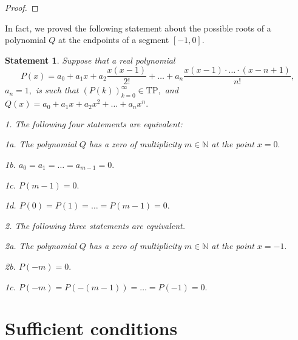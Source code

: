 \documentclass[12pt]{amsart}
\newcounter{count}
\numberwithin{count}{section}
\newtheorem{Statement}[count]{Statement}
\begin{document}
\begin{proof}


\end{proof}

In fact, we proved the following statement  about the possible 
roots of a polynomial $Q$ at the endpoints of a segment $[-1, 0].$

\begin{Statement}
\label{st2}
Suppose that a real polynomial 
$$P(x)= a_0 + a_1 x +a_2 \frac{x(x-1)}{2!} 
+  \ldots +a_n \frac{x(x-1)\cdot \ldots \cdot (x-n+1)}{n!},$$
$a_n=1, $   is such that $(P(k))_{k=0}^\infty \in \mathrm{TP},$  and
$Q(x)= a_0 + a_1 x +a_2 x^2 + \ldots + a_n x^n .$

1. The following four statements are equivalent:

1a. The polynomial $Q$ has a zero of
multiplicity $m\in \mathbb{N}$ at the point $x=0.$ 

1b. $a_0 = a_1 = \ldots =a_{m-1}=0.$

1c. $P(m-1)=0.$

1d. $P(0) = P(1) = \ldots = P(m-1)=0.$



2. The following three statements are equivalent.

2a. The polynomial $Q$ has a zero of
multiplicity $m\in \mathbb{N}$ at the point $x=-1.$

2b. $P(-m)=0.$

1c. $P(-m) = P(-(m-1)) = \ldots = P(-1)=0.$

\end{Statement}


\section{Sufficient conditions}
\end{document}
